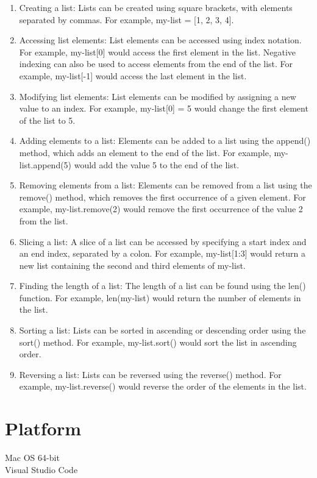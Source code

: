 \documentclass{article}
\begin{document}
\begin{itemize}
		\begin{enumerate}
			\item  Creating a list: Lists can be created using square brackets, with elements separated by commas. For example, my-list = [1, 2, 3, 4].
			\item Accessing list elements: List elements can be accessed using index notation. For example, my-list[0] would access the first element in the list. Negative indexing can also be used to access elements from the end of the list. For example, my-list[-1] would access the last element in the list.
			\item Modifying list elements: List elements can be modified by assigning a new value to an index. For example, my-list[0] = 5 would change the first element of the list to 5.
			\item Adding elements to a list: Elements can be added to a list using the append() method, which adds an element to the end of the list. For example, my-list.append(5) would add the value 5 to the end of the list.
			\item Removing elements from a list: Elements can be removed from a list using the remove() method, which removes the first occurrence of a given element. For example, my-list.remove(2) would remove the first occurrence of the value 2 from the list.
			\item Slicing a list: A slice of a list can be accessed by specifying a start index and an end index, separated by a colon. For example, my-list[1:3] would return a new list containing the second and third elements of my-list.
			\item Finding the length of a list: The length of a list can be found using the len() function. For example, len(my-list) would return the number of elements in the list.
			\item Sorting a list: Lists can be sorted in ascending or descending order using the sort() method. For example, my-list.sort() would sort the list in ascending order.
			\item Reversing a list: Lists can be reversed using the reverse() method. For example, my-list.reverse() would reverse the order of the elements in the list.
		\end{enumerate}
	\end{itemize}
	\section{\textbf{Platform}}
	Mac OS 64-bit\\
	Visual Studio Code
\end{document}
